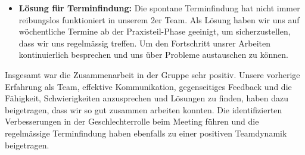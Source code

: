 \begin{itemize}
    \item \textbf{Lösung für Terminfindung:} Die spontane Terminfindung hat nicht immer reibungslos funktioniert in unserem 2er Team. Als Lösung haben wir uns auf wöchentliche Termine ab der Praxisteil-Phase geeinigt, um sicherzustellen, dass wir uns regelmässig treffen. Um den Fortschritt unsrer Arbeiten kontinuierlich besprechen und uns über Probleme austauschen zu können.
\end{itemize}

Insgesamt war die Zusammenarbeit in der Gruppe sehr positiv. 
Unsere vorherige Erfahrung als Team, effektive Kommunikation, gegenseitiges Feedback und die Fähigkeit, Schwierigkeiten 
anzusprechen und Lösungen zu finden, haben dazu beigetragen, dass wir so gut zusammen arbeiten konnten. 
Die identifizierten Verbesserungen in der Geschlechterrolle beim Meeting führen und die regelmässige Terminfindung haben ebenfalls 
zu einer positiven Teamdynamik beigetragen.